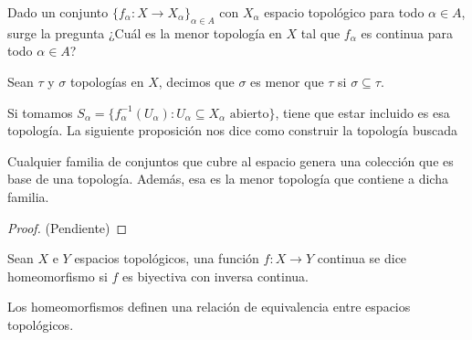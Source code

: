 \documentclass[11pt]{article}
\begin{document}
\vspace{2mm}
\noindent Dado un conjunto $\{f_{\alpha}:X\to X_{\alpha}\}_{\alpha\in A}$ con $X_{\alpha}$ espacio
topológico para todo $\alpha\in A$, surge la pregunta ¿Cuál es la menor topología en $X$ tal que
$f_{\alpha}$ es continua para todo $\alpha\in A$?

\begin{dfn}
    Sean $\tau$ y $\sigma$ topologías en $X$, decimos que $\sigma$ es menor que $\tau$ si 
    $\sigma\subseteq\tau$.
\end{dfn}

\noindent Si tomamos $S_{\alpha}=\{f_{\alpha}^{-1}(U_{\alpha}):U_{\alpha}\subseteq X_{\alpha} 
\text{ abierto}\}$, tiene que estar incluido es esa topología. La siguiente proposición nos dice
como construir la topología buscada

\begin{prop}
    Cualquier familia de conjuntos que cubre al espacio genera una colección que es base de una 
    topología. Además, esa es la menor topología que contiene a dicha familia.
\end{prop}

\begin{proof}
    (Pendiente)
\end{proof}

\begin{dfn}
    Sean $X$ e $Y$ espacios topológicos, una función $f:X\to Y$ continua se dice homeomorfismo si 
    $f$ es biyectiva con inversa continua.
\end{dfn}

\noindent Los homeomorfismos definen una relación de equivalencia entre espacios topológicos.

\end{document}
